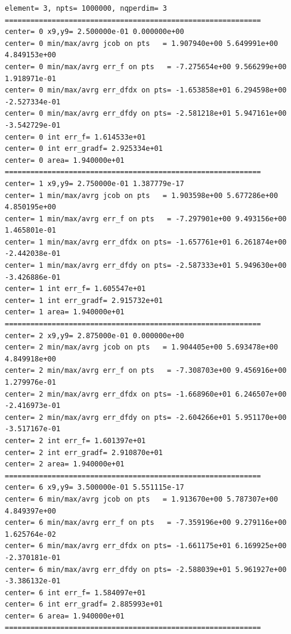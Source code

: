 \begin{tiny}
\begin{verbatim}
element= 3, npts= 1000000, nqperdim= 3
============================================================
center= 0 x9,y9= 2.500000e-01 0.000000e+00 
center= 0 min/max/avrg jcob on pts   = 1.907940e+00 5.649991e+00 4.849153e+00
center= 0 min/max/avrg err_f on pts   = -7.275654e+00 9.566299e+00 1.918971e-01
center= 0 min/max/avrg err_dfdx on pts= -1.653858e+01 6.294598e+00 -2.527334e-01
center= 0 min/max/avrg err_dfdy on pts= -2.581218e+01 5.947161e+00 -3.542729e-01
center= 0 int err_f= 1.614533e+01
center= 0 int err_gradf= 2.925334e+01
center= 0 area= 1.940000e+01
============================================================
center= 1 x9,y9= 2.750000e-01 1.387779e-17 
center= 1 min/max/avrg jcob on pts   = 1.903598e+00 5.677286e+00 4.850195e+00
center= 1 min/max/avrg err_f on pts   = -7.297901e+00 9.493156e+00 1.465801e-01
center= 1 min/max/avrg err_dfdx on pts= -1.657761e+01 6.261874e+00 -2.442038e-01
center= 1 min/max/avrg err_dfdy on pts= -2.587333e+01 5.949630e+00 -3.426886e-01
center= 1 int err_f= 1.605547e+01
center= 1 int err_gradf= 2.915732e+01
center= 1 area= 1.940000e+01
============================================================
center= 2 x9,y9= 2.875000e-01 0.000000e+00 
center= 2 min/max/avrg jcob on pts   = 1.904405e+00 5.693478e+00 4.849918e+00
center= 2 min/max/avrg err_f on pts   = -7.308703e+00 9.456916e+00 1.279976e-01
center= 2 min/max/avrg err_dfdx on pts= -1.668960e+01 6.246507e+00 -2.416973e-01
center= 2 min/max/avrg err_dfdy on pts= -2.604266e+01 5.951170e+00 -3.517167e-01
center= 2 int err_f= 1.601397e+01
center= 2 int err_gradf= 2.910870e+01
center= 2 area= 1.940000e+01
============================================================
center= 6 x9,y9= 3.500000e-01 5.551115e-17 
center= 6 min/max/avrg jcob on pts   = 1.913670e+00 5.787307e+00 4.849397e+00
center= 6 min/max/avrg err_f on pts   = -7.359196e+00 9.279116e+00 1.625764e-02
center= 6 min/max/avrg err_dfdx on pts= -1.661175e+01 6.169925e+00 -2.370181e-01
center= 6 min/max/avrg err_dfdy on pts= -2.588039e+01 5.961927e+00 -3.386132e-01
center= 6 int err_f= 1.584097e+01
center= 6 int err_gradf= 2.885993e+01
center= 6 area= 1.940000e+01
============================================================
\end{verbatim}
\end{tiny}

